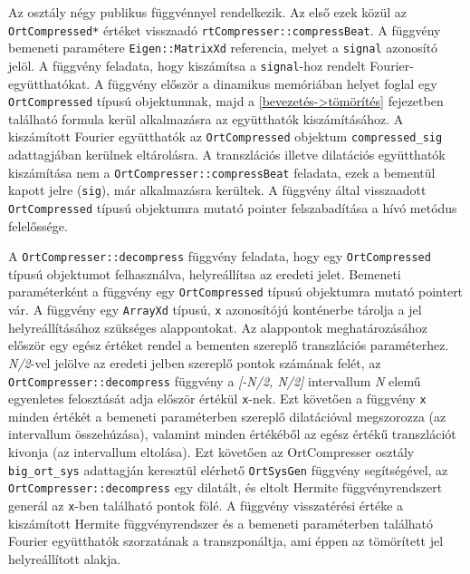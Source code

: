 \documentclass[oneside,titlepage,12pt,a4paper]{report}
\begin{document}
\par Az osztály négy publikus függvénnyel rendelkezik. Az első ezek közül az \texttt{OrtCompressed*} értéket visszaadó \texttt{rtCompresser::compressBeat}. A függvény bemeneti paramétere \texttt{Eigen::MatrixXd} referencia, melyet a \texttt{signal} azonosító jelöl. A függvény feladata, hogy kiszámítsa a \texttt{signal}-hoz rendelt Fourier-együtthatókat. A függvény először a dinamikus memóriában helyet foglal egy \texttt{OrtCompressed} típusú objektumnak, majd a \ref{bevezetés->tömörítés} fejezetben található formula kerül alkalmazásra az együtthatók kiszámításához. A kiszámított Fourier együtthatók az \texttt{OrtCompressed} objektum \texttt{compressed\_sig} adattagjában kerülnek eltárolásra. A transzlációs illetve dilatációs együtthatók kiszámítása nem a \texttt{OrtCompresser::compressBeat} feladata, ezek a bementül kapott jelre (\texttt{sig}), már alkalmazásra kerültek. A függvény által visszaadott \texttt{OrtCompressed} típusú objektumra mutató pointer felszabadítása a hívó metódus felelőssége. 
\par A \texttt{OrtCompresser::decompress} függvény feladata, hogy egy \texttt{OrtCompressed} típusú objektumot felhasználva, helyreállítsa az eredeti jelet. Bemeneti paraméterként a függvény egy \texttt{OrtCompressed} típusú objektumra mutató pointert vár. A függvény egy \texttt{ArrayXd} típusú, \texttt{x} azonosítójú konténerbe tárolja a jel helyreállításához szükséges alappontokat. Az alappontok meghatározásához először egy egész értéket rendel a bementen szereplő transzlációs paraméterhez. \textit{N/2}-vel jelölve az eredeti jelben szereplő pontok számának felét, az \texttt{OrtCompresser::decompress} függvény a \textit{[-N/2, N/2]} intervallum \textit{N} elemű egyenletes felosztását adja először értékül \texttt{x}-nek. Ezt követően a függvény \texttt{x} minden értékét a bemeneti paraméterben szereplő dilatációval megszorozza (az intervallum összehúzása), valamint minden értékéből az egész értékű transzlációt kivonja (az intervallum eltolása). Ezt követően az OrtCompresser osztály \texttt{big\_ort\_sys} adattagján keresztül elérhető \texttt{OrtSysGen} függvény segítségével, az  \texttt{OrtCompresser::decompress}
 egy dilatált, és eltolt Hermite függvényrendszert generál az \texttt{x}-ben található pontok fölé. A függvény visszatérési értéke a kiszámított Hermite függvényrendszer és a bemeneti paraméterben található Fourier együtthatók szorzatának a transzponáltja, ami éppen az tömörített jel helyreállított alakja.
\end{document}
